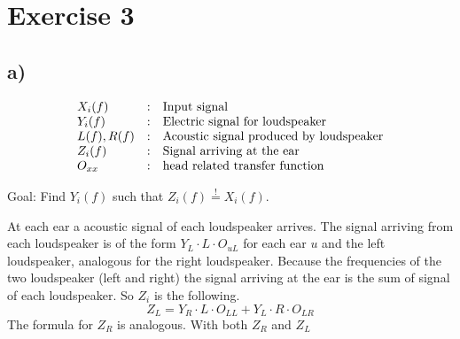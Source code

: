 \documentclass[10pt]{article}
\begin{document}
  \section*{Exercise 3}
    \subsection*{a)}
      \begin{displaymath}
        \begin{array}{l c l}
          X_{i}(f) & : & \text{Input signal} \\
          Y_{i}(f) & : & \text{Electric signal for loudspeaker} \\
          L(f),R(f)& : & \text{Acoustic signal produced by loudspeaker} \\
          Z_{i}(f) & : & \text{Signal arriving at the ear} \\
          O_{xx}   & : & \text{head related transfer function}
        \end{array}
      \end{displaymath}

      Goal: Find $Y_{i}(f)$ such that $Z_{i}(f)\overset{!}{=} X_{i}(f)$.

      At each ear a acoustic signal of each loudspeaker arrives. The signal
      arriving from each loudspeaker is of the form $Y_{L}\cdot L\cdot
      O_{uL}$ for each ear $u$ and the left loudspeaker, analogous for the right
      loudspeaker. Because the frequencies of
      the two loudspeaker (left and right) the signal arriving at the ear is the
      sum of signal of each loudspeaker. So $Z_{i}$ is the following.
      \begin{displaymath}
        Z_{L}=Y_{R}\cdot L\cdot O_{LL} + Y_{L}\cdot R\cdot O_{LR}
      \end{displaymath}
      The formula for $Z_{R}$ is analogous. With both $Z_{R}$ and $Z_{L}$ 
\end{document}
